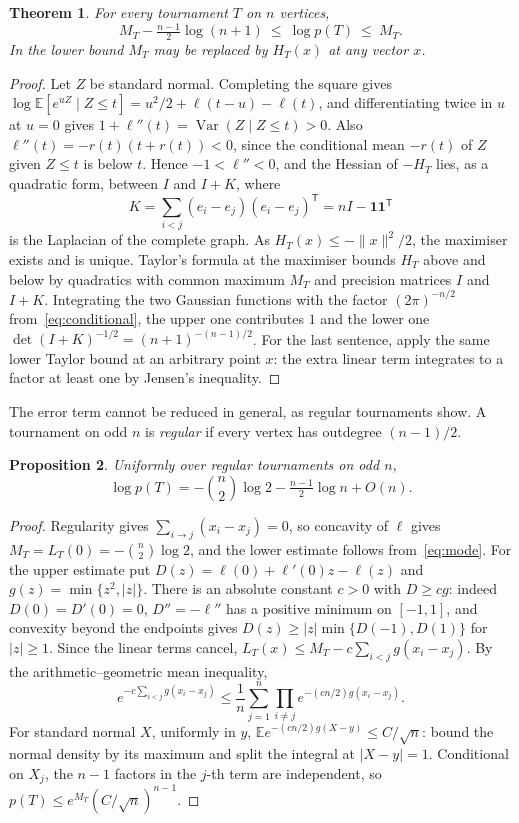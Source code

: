 \documentclass[11pt,a4paper]{article}
\newtheorem{theorem}{Theorem}[section]
\newtheorem{proposition}[theorem]{Proposition}
\theoremstyle{definition}
\newcommand{\E}{\mathbb E}
\begin{document}
\begin{theorem}\label{thm:mode}
For every tournament $T$ on $n$ vertices,
\begin{equation}
 M_T-\tfrac{n-1}{2}\log(n+1)\ \le\ \log p(T)\ \le\ M_T .
 \label{eq:mode}
\end{equation}
In the lower bound $M_T$ may be replaced by $H_T(x)$ at any vector $x$.
\end{theorem}

\begin{proof}
Let $Z$ be standard normal. Completing the square gives $\log\E[e^{uZ}\mid Z\le t]=u^2/2+\ell(t-u)-\ell(t)$, and differentiating twice in $u$ at $u=0$ gives $1+\ell''(t)=\operatorname{Var}(Z\mid Z\le t)>0$. Also $\ell''(t)=-r(t)(t+r(t))<0$, since the conditional mean $-r(t)$ of $Z$ given $Z\le t$ is below $t$. Hence $-1<\ell''<0$, and the Hessian of $-H_T$ lies, as a quadratic form, between $I$ and $I+K$, where
\[
 K=\sum_{i<j}(e_i-e_j)(e_i-e_j)^{\mathsf T}=nI-\mathbf1\mathbf1^{\mathsf T}
\]
is the Laplacian of the complete graph. As $H_T(x)\le-\|x\|^2/2$, the maximiser exists and is unique. Taylor's formula at the maximiser bounds $H_T$ above and below by quadratics with common maximum $M_T$ and precision matrices $I$ and $I+K$. Integrating the two Gaussian functions with the factor $(2\pi)^{-n/2}$ from~\eqref{eq:conditional}, the upper one contributes $1$ and the lower one $\det(I+K)^{-1/2}=(n+1)^{-(n-1)/2}$. For the last sentence, apply the same lower Taylor bound at an arbitrary point $x$: the extra linear term integrates to a factor at least one by Jensen's inequality.
\end{proof}

The error term cannot be reduced in general, as regular tournaments show. A tournament on odd $n$ is \emph{regular} if every vertex has outdegree $(n-1)/2$.

\begin{proposition}\label{prop:regular}
Uniformly over regular tournaments on odd $n$,
\[
 \log p(T)=-\binom n2\log 2-\tfrac{n-1}{2}\log n+O(n).
\]
\end{proposition}

\begin{proof}
Regularity gives $\sum_{i\to j}(x_i-x_j)=0$, so concavity of $\ell$ gives $M_T=L_T(0)=-\binom n2\log 2$, and the lower estimate follows from~\eqref{eq:mode}. For the upper estimate put $D(z)=\ell(0)+\ell'(0)z-\ell(z)$ and $g(z)=\min\{z^2,|z|\}$. There is an absolute constant $c>0$ with $D\ge cg$: indeed $D(0)=D'(0)=0$, $D''=-\ell''$ has a positive minimum on $[-1,1]$, and convexity beyond the endpoints gives $D(z)\ge |z|\min\{D(-1),D(1)\}$ for $|z|\ge1$. Since the linear terms cancel, $L_T(x)\le M_T-c\sum_{i<j}g(x_i-x_j)$. By the arithmetic--geometric mean inequality,
\[
 e^{-c\sum_{i<j}g(x_i-x_j)}
 \le \frac1n\sum_{j=1}^n\prod_{i\ne j}e^{-(cn/2)g(x_i-x_j)}.
\]
For standard normal $X$, uniformly in $y$, $\E e^{-(cn/2)g(X-y)}\le C/\sqrt n$: bound the normal density by its maximum and split the integral at $|X-y|=1$. Conditional on $X_j$, the $n-1$ factors in the $j$-th term are independent, so $p(T)\le e^{M_T}(C/\sqrt n)^{n-1}$.
\end{proof}
\end{document}
